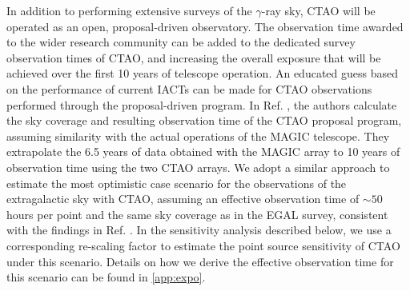 In addition to performing extensive surveys of the $\gamma$-ray sky, CTAO will be operated as an open, proposal-driven observatory. The observation time awarded to the wider research community can be added to the dedicated survey observation times of CTAO, and increasing the overall exposure that will be achieved over the first 10 years of telescope operation. An educated guess based on the performance of current IACTs can be made for CTAO observations performed through the proposal-driven program. In {Ref.} \cite{Coronado_Blazquez_2021}, the authors calculate the sky coverage and resulting observation time of the CTAO proposal program, assuming similarity with the actual operations of the MAGIC telescope. They extrapolate the 6.5 years of data obtained with the MAGIC array to 10 years of observation time using the two CTAO arrays. We adopt a similar approach to estimate the most optimistic case scenario for the observations of the extragalactic sky with CTAO, assuming an effective observation time of $\sim50$ hours per point and the same sky coverage as in the EGAL survey, consistent with the findings in {Ref.} \cite{Coronado_Blazquez_2021}. In the sensitivity analysis described below, we use a corresponding re-scaling factor to estimate the point source sensitivity of CTAO {under this scenario}. Details on how we derive the effective observation time for this scenario can be found in {\cref{app:expo}}.

